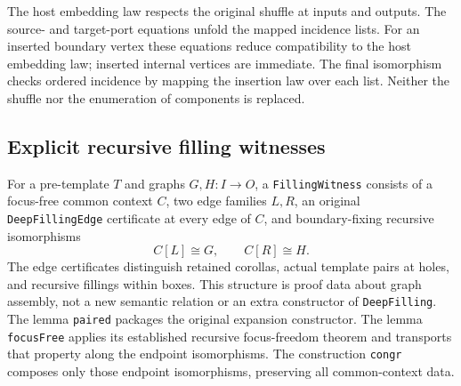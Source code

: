 
The host embedding law respects the original shuffle at inputs and outputs.
The source- and target-port equations unfold the mapped incidence lists.
For an inserted boundary vertex these equations reduce compatibility to the
host embedding law; inserted internal vertices are immediate. The final
isomorphism checks ordered incidence by mapping the insertion law over each
list. Neither the shuffle nor the enumeration of components is replaced.


\subsection{Explicit recursive filling witnesses}
For a pre-template $T$ and graphs $G,H:I\to O$, a
\texttt{FillingWitness} consists of a focus-free common context $C$, two
edge families $L,R$, an original \texttt{DeepFillingEdge} certificate at every
edge of $C$, and boundary-fixing recursive isomorphisms
\[
 C[L]\cong G,\qquad C[R]\cong H.
\]
The edge certificates distinguish retained corollas, actual template pairs
at holes, and recursive fillings within boxes. This structure is proof data
about graph assembly, not a new semantic relation or an extra constructor of
\texttt{DeepFilling}. The lemma \texttt{paired} packages the original expansion
constructor. The lemma \texttt{focusFree} applies its established recursive
focus-freedom theorem and transports that property along the endpoint
isomorphisms. The construction \texttt{congr} composes only those endpoint
isomorphisms, preserving all common-context data.


